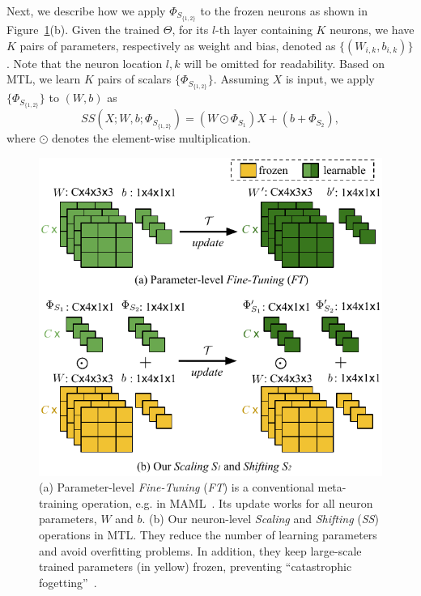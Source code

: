 Next, we describe how we apply $\Phi_{S_{\{1,2\}}}$ to the frozen neurons as shown in Figure~\ref{main_framework_SS_FT}(b). 
Given the trained $\Theta$, for its $l$-th layer containing $K$ neurons, we have $K$ pairs of parameters, respectively as weight and bias, denoted as $\{(W_{i,k}, b_{i,k})\}$. Note that the neuron location $l, k$ will be omitted for readability.
%
Based on MTL, we learn $K$ pairs of scalars $\{\Phi_{S_{\{1,2\}}}\}$. 
%
Assuming $X$ is input, we apply $\{\Phi_{S_{\{1,2\}}}\}$ to $(W, b)$ as
\begin{equation}\label{eq_SS_operation}
    SS(X; W, b; \Phi_{S_{\{1,2\}}}) =(W\odot\Phi_{S_1}) X + (b + \Phi_{S_2}),
\end{equation}
where $\odot$ denotes the element-wise multiplication.

\begin{figure}[t]
  \centering
  \includegraphics[width=0.99\linewidth]{figures/main_framework_SS_FT.pdf}
     \caption{(a) Parameter-level \emph{Fine-Tuning} (\emph{FT}) is a conventional meta-training operation, e.g. in MAML~\cite{FinnAL17}. Its update works for all neuron parameters, $W$ and $b$.
     (b) Our neuron-level \emph{Scaling} and \emph{Shifting} (\emph{SS}) operations in MTL. They reduce the number of learning parameters and avoid overfitting problems. In addition, they keep large-scale trained parameters (in yellow) frozen, preventing ``catastrophic fogetting''~\cite{LopezPazNIPS17, McCloskey1989}.
    }
  \label{main_framework_SS_FT}
\end{figure}


